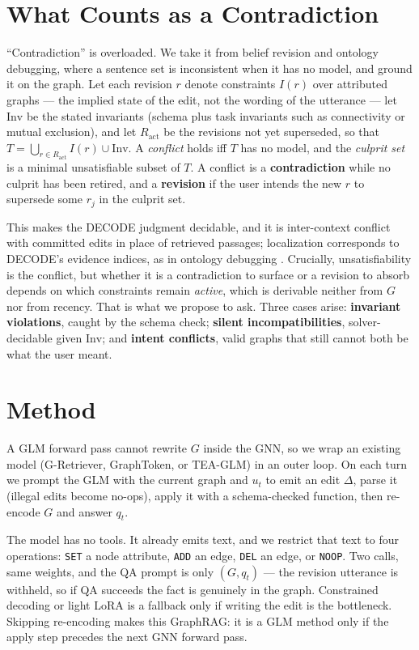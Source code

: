 \documentclass[11pt]{article}
\begin{document}
\section{What Counts as a Contradiction}

``Contradiction'' is overloaded. We take it from belief revision and ontology
debugging, where a sentence set is inconsistent when it has no model, and ground
it on the graph. Let each revision $r$ denote constraints
$I(r)$ over attributed graphs --- the implied state of the edit, not the wording
of the utterance --- let $\mathrm{Inv}$ be the stated invariants (schema plus task
invariants such as connectivity or mutual exclusion), and let $R_{\mathrm{act}}$
be the revisions not yet superseded, so that
$T = \bigcup_{r \in R_{\mathrm{act}}} I(r) \cup \mathrm{Inv}$. A \emph{conflict}
holds iff $T$ has no model, and the \emph{culprit set} is a minimal
unsatisfiable subset of $T$. A conflict is a \textbf{contradiction} while no
culprit has been retired, and a \textbf{revision} if the user intends the new $r$
to supersede some $r_j$ in the culprit set.

This makes the DECODE judgment \citep{nie-2021-decode} decidable, and it is
inter-context conflict \citep{xu-2024-knowledge} with committed edits in place of
retrieved passages; localization corresponds to DECODE's
evidence indices, as in ontology debugging
\citep{shchekotykhin-2012-interactive}. Crucially, unsatisfiability is the
conflict, but whether it is a contradiction to surface or a revision to absorb
depends on which constraints remain \emph{active}, which is derivable neither
from $G$ nor from recency. That is what we propose to ask. Three cases arise:
\textbf{invariant violations}, caught by the schema check; \textbf{silent
incompatibilities}, solver-decidable given $\mathrm{Inv}$; and \textbf{intent
conflicts}, valid graphs that still cannot both be what the user meant.

\section{Method}

A GLM forward pass cannot rewrite $G$ inside the GNN, so we wrap an existing model
(G-Retriever, GraphToken, or TEA-GLM) in an outer loop. On each turn we prompt the
GLM with the current graph and $u_t$ to emit an edit $\Delta$, parse it (illegal
edits become no-ops), apply it with a schema-checked function, then re-encode $G$
and answer $q_t$.

The model has no tools. It already emits text, and we restrict that text to four
operations: \texttt{SET} a node attribute, \texttt{ADD} an edge, \texttt{DEL} an
edge, or \texttt{NOOP}. Two calls, same weights, and the QA prompt is only
$(G, q_t)$ --- the revision utterance is withheld, so if QA succeeds the fact is
genuinely in the graph. Constrained decoding or light LoRA is a fallback only if
writing the edit is the bottleneck. Skipping re-encoding makes this GraphRAG: it
is a GLM method only if the apply step precedes the next GNN forward pass.
\end{document}
